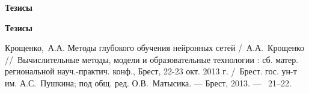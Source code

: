 


\ifx\isabstract\undefined 
\begin{center}
\vspace{11mm}
{\bf Тезисы}
\vspace{3mm}
\end{center}
\else
\vspace{2mm}
{\bf Тезисы}
\vspace{2mm}
\fi

Крощенко,~А.А. Методы глубокого обучения нейронных сетей /~А.А.~Крощенко
\newblock //~Вычислительные методы, модели и образовательные технологии : сб. матер. региональной науч.-практич. конф., Брест, 22-23 окт. 2013 г.
\newblock /~Брест. гос. ун-т им. А.С.~Пушкина; под общ. ред. О.В.~Матысика. ---
\newblock Брест, 2013. ---
~21--22.

